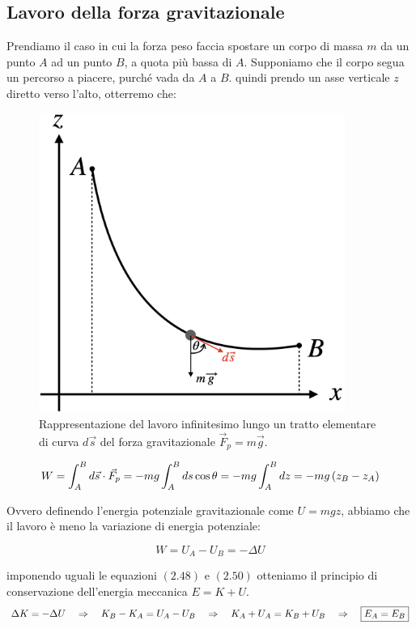 \subsection{Lavoro della forza gravitazionale}
Prendiamo il caso in cui la forza peso faccia spostare un corpo di massa $m$ da un punto $A$ ad un punto $B$, a quota più bassa di $A$. Supponiamo che il corpo segua un percorso a piacere, purché vada da $A$ a $B$. quindi prendo un asse verticale $z$ diretto verso l'alto, otterremo che:
\begin{figure}[htbp]
\begin{center}
\includegraphics[width=10cm]{images/lavorog.png}
\caption{Rappresentazione del lavoro infinitesimo lungo un tratto elementare di curva $d\vec s$ del forza gravitazionale $\vec F_p = m\vec g$.}
\end{center}
\end{figure}

\begin{equation}
W = \int_A^Bd\vec s \cdot\vec F_p = -mg\int_A^Bds\cos\theta = -mg\int_A^Bdz = -mg\left( z_B-z_A\right)
\end{equation}

Ovvero definendo l'energia potenziale gravitazionale come $U = mgz$, abbiamo che il lavoro è meno la variazione di energia potenziale:

\begin{equation}
W = U_A-U_B = -\Delta U
\end{equation}

imponendo uguali le equazioni $(2.48)$ e $(2.50)$ otteniamo il principio di conservazione dell'energia meccanica $E = K + U$.
\begin{equation}
\Delta K = -\Delta U\quad\Rightarrow\quad K_B-K_A = U_A -U_B\quad\Rightarrow\quad K_A+U_A = K_B+U_B\quad\Rightarrow\quad \boxed{E_A = E_B}
\end{equation}

